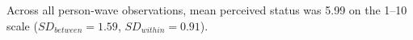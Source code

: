 Across all person-wave observations, mean perceived status was 5.99 on the 1--10 scale ($SD_{between} = 1.59$, $SD_{within} = 0.91$).